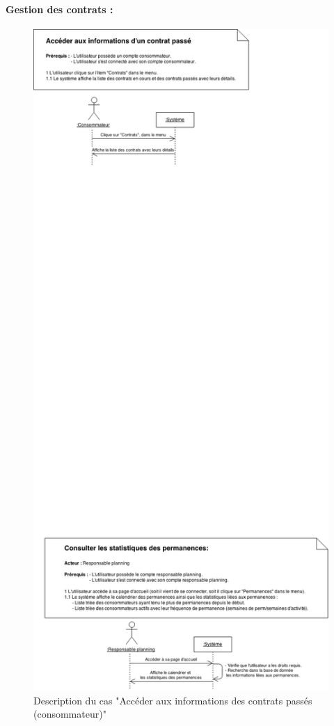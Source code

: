 \documentclass[12pt]{report}
\begin{document}
\paragraph*{Gestion des contrats :}
\begin{figure}[!h]
\centering
\includegraphics[width=1.\textwidth]{./ressources/desc_UC_contrats_passes_conso.png}
\caption{Description du cas "Accéder aux informations des contrats passés (consommateur)"}
\end{figure}
\clearpage
\end{document}
